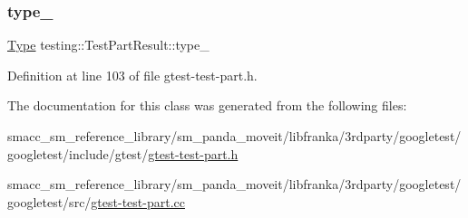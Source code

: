 \subsubsection{\texorpdfstring{type\+\_\+}{type\_}}
{\footnotesize\ttfamily \hyperlink{classtesting_1_1TestPartResult_a65ae656b33fdfdfffaf34858778a52d5}{Type} testing\+::\+Test\+Part\+Result\+::type\+\_\+\hspace{0.3cm}{\ttfamily [private]}}



Definition at line 103 of file gtest-\/test-\/part.\+h.



The documentation for this class was generated from the following files\+:\begin{DoxyCompactItemize}
\item 
smacc\+\_\+sm\+\_\+reference\+\_\+library/sm\+\_\+panda\+\_\+moveit/libfranka/3rdparty/googletest/googletest/include/gtest/\hyperlink{gtest-test-part_8h}{gtest-\/test-\/part.\+h}\item 
smacc\+\_\+sm\+\_\+reference\+\_\+library/sm\+\_\+panda\+\_\+moveit/libfranka/3rdparty/googletest/googletest/src/\hyperlink{gtest-test-part_8cc}{gtest-\/test-\/part.\+cc}\end{DoxyCompactItemize}
